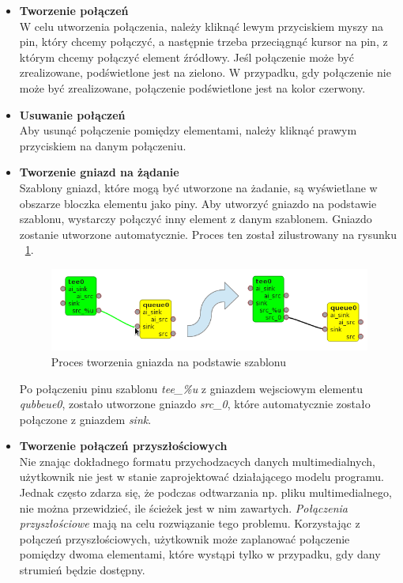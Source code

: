 \documentclass[12pt]{article}
\begin{document}
\begin{itemize}
\item \textbf{Tworzenie połączeń} \\
W celu utworzenia połączenia, należy kliknąć lewym przyciskiem myszy na pin, który chcemy połączyć, a następnie trzeba przeciągnąć kursor na pin, z którym chcemy połączyć element źródłowy. Jeśl połączenie może być zrealizowane, podświetlone jest na zielono. W przypadku, gdy połączenie nie może być zrealizowane, połączenie podświetlone jest na kolor czerwony.
\item \textbf{Usuwanie połączeń} \\ 
Aby usunąć połączenie pomiędzy elementami, należy kliknąć prawym przyciskiem na danym połączeniu.
\item \textbf{Tworzenie gniazd na żądanie} \\
Szablony gniazd, które mogą być utworzone na żadanie, są wyświetlane w obszarze bloczka elementu jako piny. Aby utworzyć gniazdo na podstawie szablonu, wystarczy połączyć inny element z danym szablonem. Gniazdo zostanie utworzone automatycznie. Proces ten został zilustrowany na rysunku ~\ref{fig:onRequestPad}.
\begin{figure}[H]
  \includegraphics[width=14cm]{img/on-request-pad.png}
  \caption{Proces tworzenia gniazda na podstawie szablonu}
  \label{fig:onRequestPad}
\end{figure}
Po połączeniu pinu szablonu \textit{tee\_\%u} z gniazdem wejsciowym elementu \textit{qubbeue0}, zostało utworzone gniazdo \textit{src\_0}, które automatycznie zostało połączone z gniazdem \textit{sink}.
\item \textbf{Tworzenie połączeń przyszłościowych} \\
Nie znając dokładnego formatu przychodzacych danych multimedialnych, użytkownik nie jest w stanie zaprojektować działającego modelu programu. Jednak często zdarza się, że podczas odtwarzania np. pliku multimedialnego, nie można przewidzieć, ile ścieżek jest w nim zawartych. \textit{Połączenia przyszłościowe} mają na celu rozwiązanie tego problemu. Korzystając z połączeń przyszłościowych, użytkownik może zaplanować połączenie pomiędzy dwoma elementami, które wystąpi tylko w przypadku, gdy dany strumień będzie dostępny.

\end{itemize}
\end{document}
